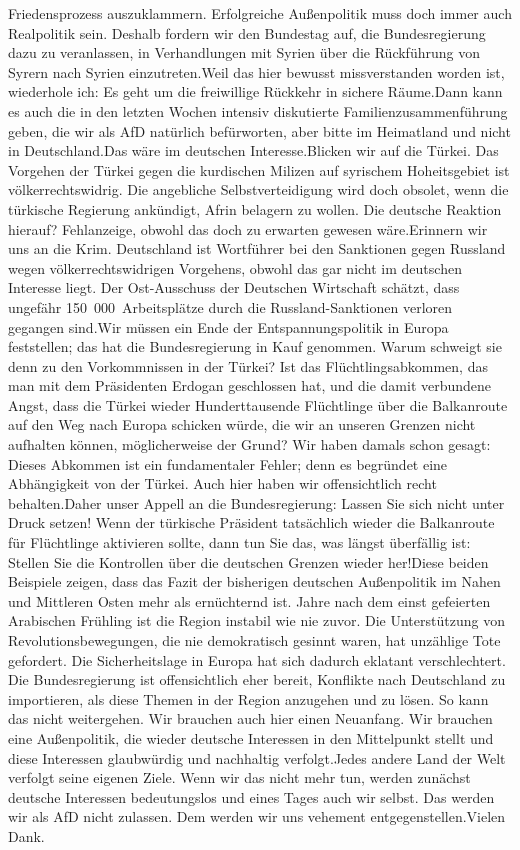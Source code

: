 \documentclass{article}
\begin{document}
Friedensprozess auszuklammern. Erfolgreiche Außenpolitik muss doch immer auch Realpolitik sein. Deshalb fordern wir den Bundestag auf, die Bundesregierung dazu zu veranlassen, in Verhandlungen mit Syrien über die Rückführung von Syrern nach Syrien einzutreten.Weil das hier bewusst missverstanden worden ist, wiederhole ich: Es geht um die freiwillige Rückkehr in sichere Räume.Dann kann es auch die in den letzten Wochen intensiv diskutierte Familienzusammenführung geben, die wir als AfD natürlich befürworten, aber bitte im Heimatland und nicht in Deutschland.Das wäre im deutschen Interesse.Blicken wir auf die Türkei. Das Vorgehen der Türkei gegen die kurdischen Milizen auf syrischem Hoheitsgebiet ist völkerrechtswidrig. Die angebliche Selbstverteidigung wird doch obsolet, wenn die türkische Regierung ankündigt, Afrin belagern zu wollen. Die deutsche Reaktion hierauf? Fehlanzeige, obwohl das doch zu erwarten gewesen wäre.Erinnern wir uns an die Krim. Deutschland ist Wortführer bei den Sanktionen gegen Russland wegen völkerrechtswidrigen Vorgehens, obwohl das gar nicht im deutschen Interesse liegt. Der Ost-Ausschuss der Deutschen Wirtschaft schätzt, dass ungefähr 150 000 Arbeitsplätze durch die Russland-Sanktionen verloren gegangen sind.Wir müssen ein Ende der Entspannungspolitik in Europa feststellen; das hat die Bundesregierung in Kauf genommen. Warum schweigt sie denn zu den Vorkommnissen in der Türkei? Ist das Flüchtlingsabkommen, das man mit dem Präsidenten Erdogan geschlossen hat, und die damit verbundene Angst, dass die Türkei wieder Hunderttausende Flüchtlinge über die Balkanroute auf den Weg nach Europa schicken würde, die wir an unseren Grenzen nicht aufhalten können, möglicherweise der Grund? Wir haben damals schon gesagt: Dieses Abkommen ist ein fundamentaler Fehler; denn es begründet eine Abhängigkeit von der Türkei. Auch hier haben wir offensichtlich recht behalten.Daher unser Appell an die Bundesregierung: Lassen Sie sich nicht unter Druck setzen! Wenn der türkische Präsident tatsächlich wieder die Balkanroute für Flüchtlinge aktivieren sollte, dann tun Sie das, was längst überfällig ist: Stellen Sie die Kontrollen über die deutschen Grenzen wieder her!Diese beiden Beispiele zeigen, dass das Fazit der bisherigen deutschen Außenpolitik im Nahen und Mittleren Osten mehr als ernüchternd ist. Jahre nach dem einst gefeierten Arabischen Frühling ist die Region instabil wie nie zuvor. Die Unterstützung von Revolutionsbewegungen, die nie demokratisch gesinnt waren, hat unzählige Tote gefordert. Die Sicherheitslage in Europa hat sich dadurch eklatant verschlechtert. Die Bundesregierung ist offensichtlich eher bereit, Konflikte nach Deutschland zu importieren, als diese Themen in der Region anzugehen und zu lösen. So kann das nicht weitergehen. Wir brauchen auch hier einen Neuanfang. Wir brauchen eine Außenpolitik, die wieder deutsche Interessen in den Mittelpunkt stellt und diese Interessen glaubwürdig und nachhaltig verfolgt.Jedes andere Land der Welt verfolgt seine eigenen Ziele. Wenn wir das nicht mehr tun, werden zunächst deutsche Interessen bedeutungslos und eines Tages auch wir selbst. Das werden wir als AfD nicht zulassen. Dem werden wir uns vehement entgegenstellen.Vielen Dank.
\end{document}
